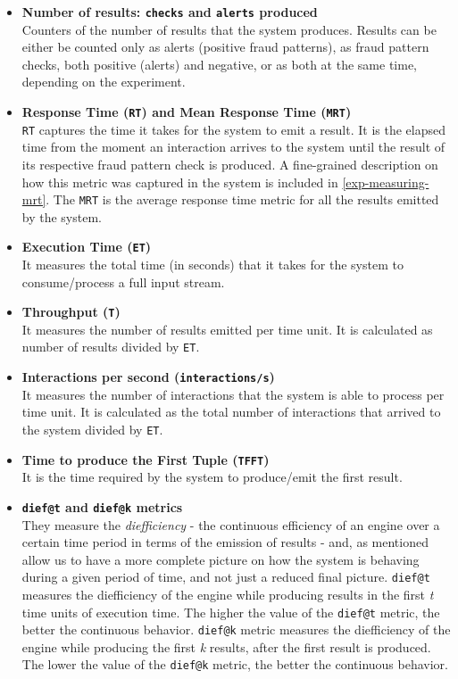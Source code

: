 \begin{itemize}
    \item \textbf{Number of results: \texttt{checks} and \texttt{alerts} produced\\}
    Counters of the number of results that the system produces. Results can be either be counted only as alerts (positive fraud patterns), as fraud pattern checks, both positive (alerts) and negative, or as both at the same time, depending on the experiment. 
    \item \textbf{Response Time (\texttt{RT}) and Mean Response Time (\texttt{MRT})\\}
    \texttt{RT} captures the time it takes for the system to emit a result. It is the elapsed time from the moment an interaction arrives to the system until the result of its respective fraud pattern check is produced. A fine-grained description on how this metric was captured in the \DPATM system is included in \ref{exp-measuring-mrt}. The \texttt{MRT} is the average response time metric for all the results emitted by the system.
    \item \textbf{Execution Time (\texttt{ET})\\}
    It measures the total time (in seconds) that it takes for the system to consume/process a full input stream.
    \item \textbf{Throughput (\texttt{T})\\}
    It measures the number of results emitted per time unit. It is calculated as number of results divided by \texttt{ET}.
    \item \textbf{Interactions per second (\texttt{interactions/s})\\}
    It measures the number of interactions that the system is able to process per time unit. It is calculated as the total number of interactions that arrived to the system divided by \texttt{ET}.
    \item \textbf{Time to produce the First Tuple (\texttt{TFFT})\\}
    It is the time required by the system to produce/emit the first result.
    \item \textbf{\texttt{dief@t} and \texttt{dief@k} metrics\\}
    They measure the \emph{diefficiency} - the continuous efficiency of an engine over a certain time period in terms of the emission of results - and, as mentioned allow us to have a more complete picture on how the system is behaving during a given period of time, and not just a reduced final picture. \texttt{dief@t} measures the diefficiency of the engine while producing results in the first \emph{t} time units of execution time. The higher the value of the \texttt{dief@t} metric, the better the continuous behavior. \texttt{dief@k} metric measures the diefficiency of the engine while producing the first \emph{k} results, after the first result is produced. The lower the value of the \texttt{dief@k} metric, the better the continuous behavior.


\end{itemize}
